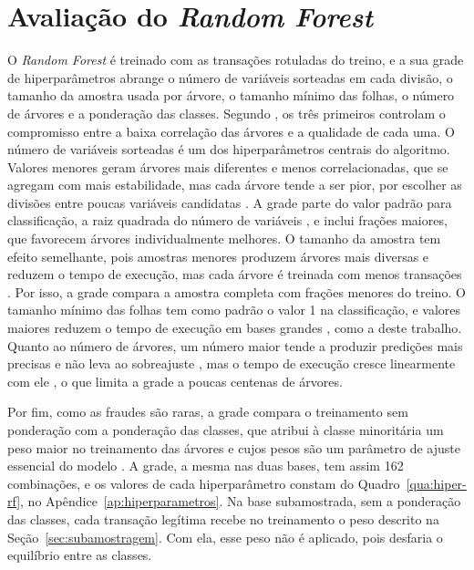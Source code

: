 \documentclass{uflamon}          %
\begin{document}
\section{Avaliação do \texorpdfstring{\textit{Random Forest}}{Random Forest}}
\label{sec:avaliacao-rf}

O \textit{Random Forest} é treinado com as transações rotuladas do treino, e a sua grade de hiperparâmetros abrange o número de variáveis sorteadas em cada divisão, o tamanho da amostra usada por árvore, o tamanho mínimo das folhas, o número de árvores e a ponderação das classes. Segundo , os três primeiros controlam o compromisso entre a baixa correlação das árvores e a qualidade de cada uma. O número de variáveis sorteadas é um dos hiperparâmetros centrais do algoritmo. Valores menores geram árvores mais diferentes e menos correlacionadas, que se agregam com mais estabilidade, mas cada árvore tende a ser pior, por escolher as divisões entre poucas variáveis candidatas \cite{probst2019}. A grade parte do valor padrão para classificação, a raiz quadrada do número de variáveis \cite{probst2019}, e inclui frações maiores, que favorecem árvores individualmente melhores. O tamanho da amostra tem efeito semelhante, pois amostras menores produzem árvores mais diversas e reduzem o tempo de execução, mas cada árvore é treinada com menos transações \cite{probst2019}. Por isso, a grade compara a amostra completa com frações menores do treino. O tamanho mínimo das folhas tem como padrão o valor 1 na classificação, e valores maiores reduzem o tempo de execução em bases grandes \cite{probst2019}, como a deste trabalho. Quanto ao número de árvores, um número maior tende a produzir predições mais precisas e não leva ao sobreajuste \cite{biau2016}, mas o tempo de execução cresce linearmente com ele \cite{probst2019}, o que limita a grade a poucas centenas de árvores.

Por fim, como as fraudes são raras, a grade compara o treinamento sem ponderação com a ponderação das classes, que atribui à classe minoritária um peso maior no treinamento das árvores e cujos pesos são um parâmetro de ajuste essencial do modelo \cite{chen2004}. A grade, a mesma nas duas bases, tem assim 162 combinações, e os valores de cada hiperparâmetro constam do Quadro~\ref{qua:hiper-rf}, no Apêndice~\ref{ap:hiperparametros}. Na base subamostrada, sem a ponderação das classes, cada transação legítima recebe no treinamento o peso descrito na Seção~\ref{sec:subamostragem}. Com ela, esse peso não é aplicado, pois desfaria o equilíbrio entre as classes.
\end{document}
